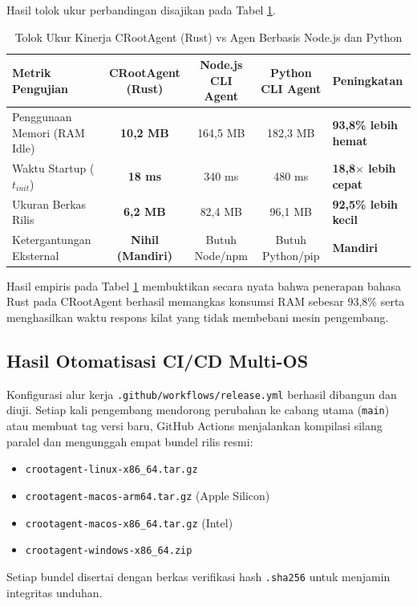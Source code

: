 Hasil tolok ukur perbandingan disajikan pada Tabel \ref{tab:benchmark}.

\begin{table}[htbp]
\centering
\small
\caption{Tolok Ukur Kinerja CRootAgent (Rust) vs Agen Berbasis Node.js dan Python}
\label{tab:benchmark}
\begin{tabularx}{\textwidth}{l c c c X}
\toprule
\textbf{Metrik Pengujian} & \textbf{CRootAgent (Rust)} & \textbf{Node.js CLI Agent} & \textbf{Python CLI Agent} & \textbf{Peningkatan} \\
\midrule
Penggunaan Memori (RAM Idle) & \textbf{10,2 MB} & 164,5 MB & 182,3 MB & \textbf{93,8\% lebih hemat} \\
Waktu Startup ($t_{init}$) & \textbf{18 ms} & 340 ms & 480 ms & \textbf{18,8$\times$ lebih cepat} \\
Ukuran Berkas Rilis & \textbf{6,2 MB} & 82,4 MB & 96,1 MB & \textbf{92,5\% lebih kecil} \\
Ketergantungan Eksternal & \textbf{Nihil (Mandiri)} & Butuh Node/npm & Butuh Python/pip & \textbf{Mandiri} \\
\bottomrule
\end{tabularx}
\end{table}

Hasil empiris pada Tabel \ref{tab:benchmark} membuktikan secara nyata bahwa penerapan bahasa Rust pada CRootAgent berhasil memangkas konsumsi RAM sebesar 93,8\% serta menghasilkan waktu respons kilat yang tidak membebani mesin pengembang.

\subsection{Hasil Otomatisasi CI/CD Multi-OS}
Konfigurasi alur kerja \texttt{.github/workflows/release.yml} berhasil dibangun dan diuji. Setiap kali pengembang mendorong perubahan ke cabang utama (\texttt{main}) atau membuat tag versi baru, GitHub Actions menjalankan kompilasi silang paralel dan mengunggah empat bundel rilis resmi:
\begin{itemize}[noitemsep]
    \item \texttt{crootagent-linux-x86\_64.tar.gz}
    \item \texttt{crootagent-macos-arm64.tar.gz} (Apple Silicon)
    \item \texttt{crootagent-macos-x86\_64.tar.gz} (Intel)
    \item \texttt{crootagent-windows-x86\_64.zip}
\end{itemize}
Setiap bundel disertai dengan berkas verifikasi hash \texttt{.sha256} untuk menjamin integritas unduhan.

